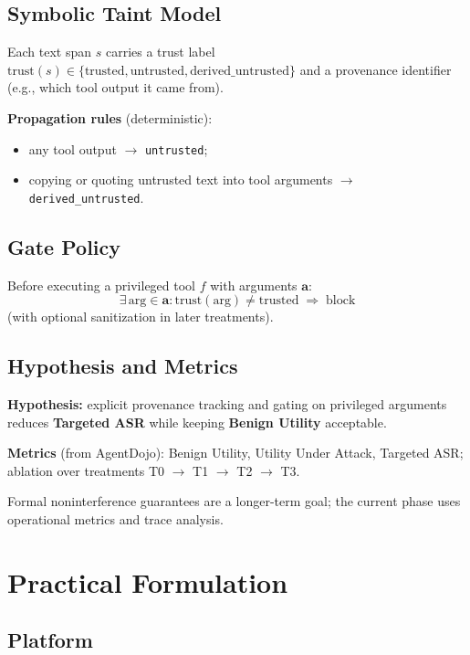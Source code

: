 \documentclass[11pt,a4paper]{article}
\begin{document}
\subsection{Symbolic Taint Model}

Each text span $s$ carries a trust label $\mathrm{trust}(s) \in \{\text{trusted}, \text{untrusted}, \text{derived\_untrusted}\}$ and a provenance identifier (e.g., which tool output it came from).

\textbf{Propagation rules} (deterministic):
\begin{itemize}
  \item any tool output $\rightarrow$ \texttt{untrusted};
  \item copying or quoting untrusted text into tool arguments $\rightarrow$ \texttt{derived\_untrusted}.
\end{itemize}

\subsection{Gate Policy}

Before executing a privileged tool $f$ with arguments $\mathbf{a}$:
\[
\exists\, \mathrm{arg} \in \mathbf{a} : \mathrm{trust}(\mathrm{arg}) \neq \text{trusted} \;\Rightarrow\; \text{block}
\]
(with optional sanitization in later treatments).

\subsection{Hypothesis and Metrics}

\textbf{Hypothesis:} explicit provenance tracking and gating on privileged arguments reduces \textbf{Targeted ASR} while keeping \textbf{Benign Utility} acceptable.

\textbf{Metrics} (from AgentDojo): Benign Utility, Utility Under Attack, Targeted ASR; ablation over treatments T0 $\rightarrow$ T1 $\rightarrow$ T2 $\rightarrow$ T3.

Formal noninterference guarantees are a longer-term goal; the current phase uses operational metrics and trace analysis.

\section{Practical Formulation}

\subsection{Platform}
\end{document}
